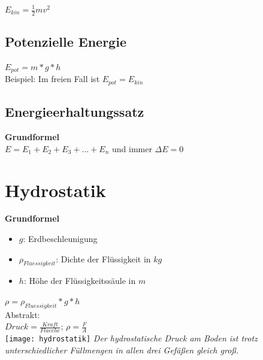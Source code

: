 \documentclass[a4paper,10pt]{article}
\begin{document}
\begin{multicols}{2}
  \(E_{kin} = \frac{1}{2} mv^2\)

  \subsection{Potenzielle Energie}

  \(E_{pot} = m * g * h\)\\
  Beispiel: Im freien Fall ist \(E_{pot} = E_{kin}\)\\
  

  \subsection{Energieerhaltungssatz}
  \textbf{Grundformel}\\
  \(E = E_1 + E_2 + E_3 + \dots + E_n\) und immer \(\Delta E = 0\)\\

  \section{Hydrostatik}
  \textbf{Grundformel}\\
  \begin{itemize}
    \item \(g\): Erdbeschleunigung
    \item \(\rho_{Fluessigkeit}\): Dichte der Flüssigkeit in \(kg\)
    \item \(h\): Höhe der Flüssigkeitssäule in \(m\)
  \end{itemize}
  \(\rho = \rho_{Fluessigkeit} * g * h\)\\
  Abstrakt:\\
  \(Druck = \frac{Kraft}{Flaeche}\); \(\rho = \frac{F}{A}\) \\
  \texttt{[image: hydrostatik]}
  \textit{Der hydrostatische Druck am Boden ist trotz unterschiedlicher Füllmengen in allen drei Gefäßen gleich groß.}
\end{multicols}
\end{document}

